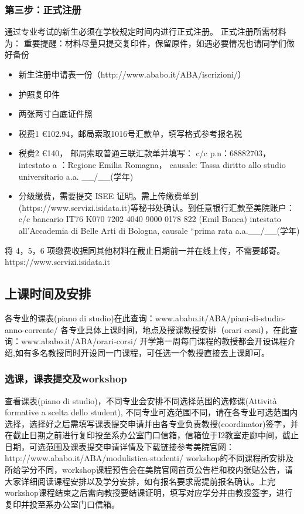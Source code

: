 \documentclass[3pt,a5paper,openright,twoside]{book}
\begin{document}
\subsubsection{第三步：正式注册}
通过专业考试的新生必须在学校规定时间内进行正式注册。
正式注册所需材料为：
重要提醒：材料尽量只提交复印件，保留原件，如遇必要情况也请同学们做好备份

\begin{itemize}
  \item 新生注册申请表一份（http://www.ababo.it/ABA/iscrizioni/）
  \item 护照复印件
  \item 两张两寸白底证件照
  \item 税费1 €102.94，邮局索取1016号汇款单，填写格式参考报名税
  \item 税费2 €140， 邮局索取普通三联汇款单并填写：                                                              c/c p.n：68882703，intestato a ：Regione Emilia Romagna， causale: Tassa diritto allo studio universitario a.a. \_\_/\_\_(学年)
  \item 分级缴费，需要提交 ISEE 证明。需上传缴费单到 (https://www.servizi.isidata.it)等秘书处确认。到任意银行汇款至美院账户：c/c bancario IT76 K070 7202 4040 9000 0178 822 (Emil Banca) intestato all’Accademia di Belle Arti di Bologna, causale “prima rata a.a.\_\_/\_\_(学年)
 \end{itemize}

 将 4，5，6 项缴费收据同其他材料在截止日期前一并在线上传，不需要邮寄。https://www.servizi.isidata.it

\subsection{上课时间及安排}
各专业的课表(piano di studio)在此查询：www.ababo.it/ABA/piani-di-studio-anno-corrente/ 
各专业具体上课时间，地点及授课教授安排（orari corsi），在此查询：www.ababo.it/ABA/orari-corsi/
开学第一周每门课程的教授都会开设课程介绍,如有多名教授同时开设同一门课程，可任选一个教授直接去上课即可。


\subsubsection{选课，课表提交及workshop}
查看课表(piano di studio)，不同专业会安排不同选择范围的选修课(Attività formative a scelta dello student), 不同专业可选范围不同，请在各专业可选范围内选择，选择好之后需填写课表提交申请并由各专业负责教授(coordinator)签字，并在截止日期之前进行复印投至系办公室门口信箱，信箱位于I2教室走廊中间，截止日期，可选范围及课表提交申请详情及下载链接参考美院官网：http://www.ababo.it/ABA/modulistica-studenti/
workshop的不同课程所安排及所给学分不同，workshop课程预告会在美院官网首页公告栏和校内张贴公告，请大家详细阅读课程安排以及学分安排，如有报名要求需提前报名确认。上完workshop课程结束之后需向教授要结课证明，填写对应学分并由教授签字，进行复印并投至系办公室门口信箱。
\end{document}
